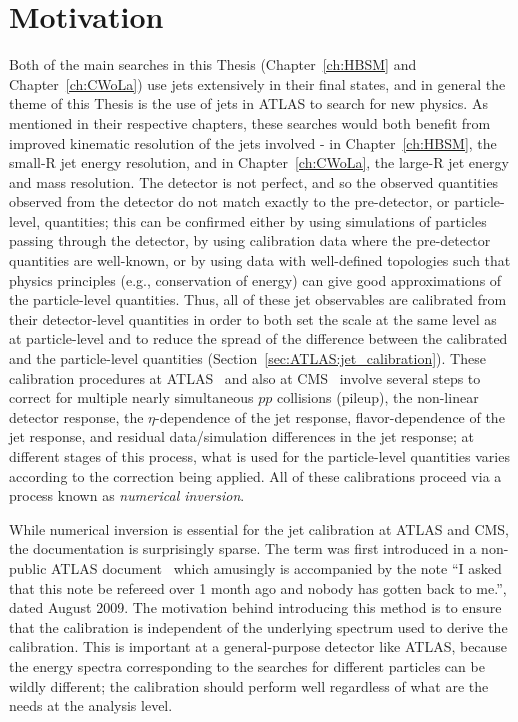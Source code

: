 \section{Motivation}
Both of the main searches in this Thesis (Chapter~\ref{ch:HBSM} and Chapter~\ref{ch:CWoLa}) use jets extensively in their final states, and in general the theme of this Thesis is the use of jets in ATLAS to search for new physics.
As mentioned in their respective chapters, these searches would both benefit from improved kinematic resolution of the jets involved - in Chapter~\ref{ch:HBSM}, the small-R jet energy resolution, and in Chapter~\ref{ch:CWoLa}, the large-R jet energy and mass resolution.
The detector is not perfect, and so the observed quantities observed from the detector do not match exactly to the pre-detector, or particle-level, quantities;
this can be confirmed either by using simulations of particles passing through the detector, by using calibration data where the pre-detector quantities are well-known, or by using data with well-defined topologies such that physics principles (e.g., conservation of energy) can give good approximations of the particle-level quantities.
Thus, all of these jet observables are calibrated from their detector-level quantities in order to both set the scale at the same level as at particle-level and to reduce the spread of the difference between the calibrated and the particle-level quantities (Section~\ref{sec:ATLAS:jet_calibration}).
These calibration procedures at ATLAS~\cite{Aad:2011he} and also at CMS~\cite{Chatrchyan:2011ds,Khachatryan:2016kdb} involve several steps to correct for multiple nearly simultaneous $pp$ collisions (pileup), the non-linear detector response, the $\eta$-dependence of the jet response, flavor-dependence of the jet response, and residual data/simulation differences in the jet response;
at different stages of this process, what is used for the particle-level quantities varies according to the correction being applied.
All of these calibrations proceed via a process known as \textit{numerical inversion}.

While numerical inversion is essential for the jet calibration at ATLAS and CMS, the documentation is surprisingly sparse.
The term was first introduced in a non-public ATLAS document~\cite{LopezMateos:1163916} which amusingly is accompanied by the note ``I asked that this note be refereed over 1 month ago and nobody has gotten back to me.'', dated August 2009. 
The motivation behind introducing this method is to ensure that the calibration is independent of the underlying spectrum used to derive the calibration.
This is important at a general-purpose detector like ATLAS, because the energy spectra corresponding to the searches for different particles can be wildly different; the calibration should perform well regardless of what are the needs at the analysis level.

